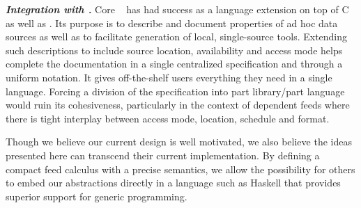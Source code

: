 \textbf{\textit{Integration with \pads{}.}}  Core
\pads{}~\cite{fisher+:pads,fisher+:popl06,fisher+:dirttoshovels,mandelbaum+:pads-ml} has had success as a language extension on top of C as well as
\ocaml{}.  Its purpose is to describe and document properties of ad hoc
data sources as well as to facilitate generation of local, single-source 
tools.  Extending such descriptions to include source location, 
availability and 
access mode helps complete the documentation in a single centralized 
specification and through a uniform notation.  It gives off-the-shelf
users everything they need in a single language.  Forcing a division 
of the specification into part library/part language would ruin its
cohesiveness, particularly in the context of
dependent feeds where there is tight interplay between access mode, location,
schedule and format.


Though we believe our current design is well motivated,
we also believe the ideas presented here can transcend
their current implementation.  By defining a compact feed calculus 
with a precise semantics, we allow the possibility for
others to embed our abstractions directly in a language
such as Haskell that provides superior support for generic programming. 
